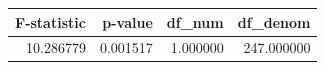 \begin{tabular}{rrrr}
\toprule
F-statistic & p-value & df\_num & df\_denom \\
\midrule
10.286779 & 0.001517 & 1.000000 & 247.000000 \\
\bottomrule
\end{tabular}